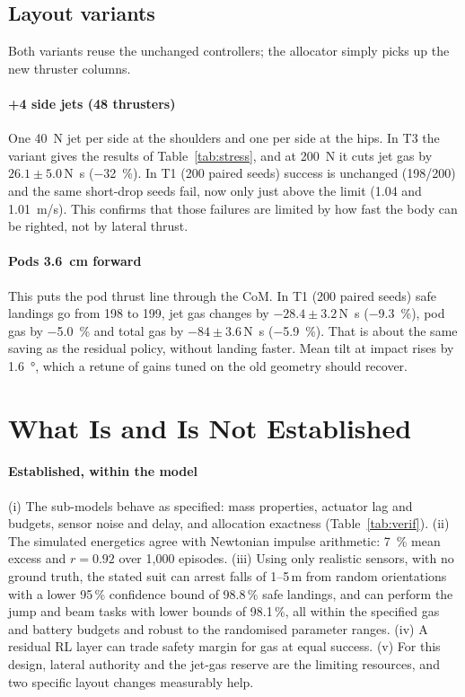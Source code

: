 \documentclass[conference]{IEEEtran}
\begin{document}
\subsection{Layout variants}
Both variants reuse the unchanged controllers; the allocator simply picks up the new thruster columns.
\paragraph*{+4 side jets (48 thrusters)} One \SI{40}{N} jet per side at the shoulders and one per side at the hips. In T3 the variant gives the results of Table~\ref{tab:stress}, and at \SI{200}{N} it cuts jet gas by $26.1\pm5.0$\,\si{N.s} (\SI{-32}{\%}). In T1 (200 paired seeds) success is unchanged (198/200) and the same short-drop seeds fail, now only just above the limit (1.04 and \SI{1.01}{m/s}). This confirms that those failures are limited by how fast the body can be righted, not by lateral thrust.
\paragraph*{Pods \SI{3.6}{cm} forward} This puts the pod thrust line through the CoM. In T1 (200 paired seeds) safe landings go from 198 to 199, jet gas changes by $-28.4\pm3.2$\,\si{N.s} (\SI{-9.3}{\%}), pod gas by \SI{-5.0}{\%} and total gas by $-84\pm3.6$\,\si{N.s} (\SI{-5.9}{\%}). That is about the same saving as the residual policy, without landing faster. Mean tilt at impact rises by \SI{1.6}{\degree}, which a retune of gains tuned on the old geometry should recover.

\section{What Is and Is Not Established}
\label{sec:claims}
\paragraph*{Established, within the model} (i) The sub-models behave as specified: mass properties, actuator lag and budgets, sensor noise and delay, and allocation exactness (Table~\ref{tab:verif}). (ii) The simulated energetics agree with Newtonian impulse arithmetic: \SI{7}{\%} mean excess and $r=0.92$ over 1{,}000 episodes. (iii) Using only realistic sensors, with no ground truth, the stated suit can arrest falls of 1--5\,m from random orientations with a lower 95\,\% confidence bound of 98.8\,\% safe landings, and can perform the jump and beam tasks with lower bounds of 98.1\,\%, all within the specified gas and battery budgets and robust to the randomised parameter ranges. (iv) A residual RL layer can trade safety margin for gas at equal success. (v) For this design, lateral authority and the jet-gas reserve are the limiting resources, and two specific layout changes measurably help.
\end{document}
